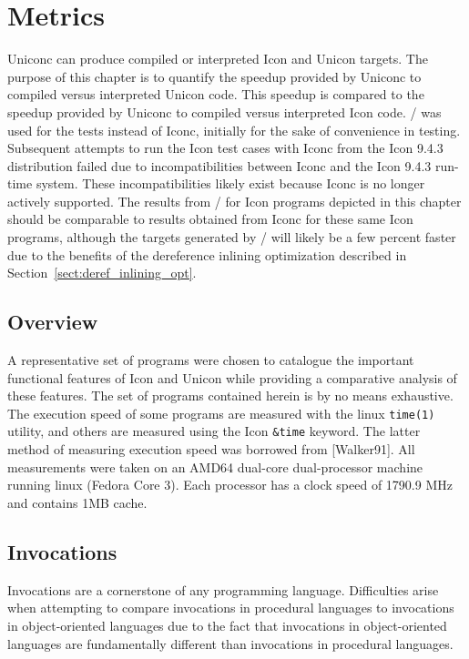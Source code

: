\section{Metrics}

Uniconc can produce compiled or interpreted Icon and Unicon targets. The purpose
of this chapter is to quantify the speedup provided by Uniconc to compiled
versus interpreted Unicon code. This speedup is compared to the speedup
provided by Uniconc to compiled versus interpreted Icon code. \Ic/ was used for
the tests instead of Iconc, initially for the sake of convenience in testing.
Subsequent attempts to run the Icon test cases with Iconc from the Icon 9.4.3
distribution failed due to incompatibilities between Iconc and the Icon 9.4.3
\mbox{run-time} system. These incompatibilities likely exist because Iconc is no longer
actively supported. The results from \Ic/ for Icon programs depicted in this
chapter should be comparable to results obtained from Iconc for these same
Icon programs, although the targets generated by \Ic/ will likely be a few
percent faster due to the benefits of the dereference inlining optimization
described in Section~\ref{sect:deref_inlining_opt}.

\subsection{Overview}
A representative set of programs were chosen to catalogue the important
functional features of Icon and Unicon while providing a comparative analysis of
these features. The set of programs contained herein is by no means exhaustive.
The execution speed of some programs are measured with the linux
\texttt{time(1)} utility, and others are measured using the Icon \texttt{\&time}
keyword. The latter method of measuring execution speed was borrowed from
[Walker91]. All measurements were taken on an AMD64 dual-core dual-processor
machine running linux (Fedora Core 3). Each processor has a clock speed of
1790.9 MHz and contains 1MB cache.

\subsection{Invocations}
Invocations are a cornerstone of any programming language. Difficulties arise
when attempting to compare invocations in procedural languages to invocations in
object-oriented languages due to the fact that invocations in object-oriented
languages are fundamentally different than invocations in procedural languages.

